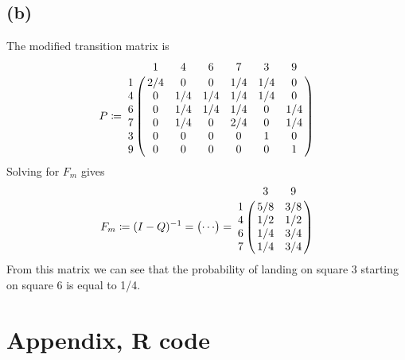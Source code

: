 \documentclass{article}
\begin{document}
\subsection{(b)}
The modified transition matrix is
\begin{equation}
	P \coloneqq \bordermatrix{~ & 1 & 4 & 6 & 7 & 3 & 9 \cr
		1 & 2/4 & 0 & 0 & 1/4 & 1/4 & 0 \cr
		4 & 0 & 1/4 & 1/4 & 1/4 & 1/4 & 0 \cr
		6 & 0 & 1/4 & 1/4 & 1/4 & 0 & 1/4 \cr
		7 & 0 & 1/4 & 0 & 2/4 & 0 & 1/4 \cr
		3 & 0 & 0 & 0 & 0 & 1 & 0 \cr
		9 & 0 & 0 & 0 & 0 & 0 & 1 \cr
		}
\end{equation}
Solving for $F_m$ gives
$$ F_m \coloneqq (I - Q)^{-1} = \begin{pmatrix}
		\cdots \\
	\end{pmatrix} =
	  \bordermatrix{~ & 3 & 9 \cr
		1 & 5/8 & 3/8 \cr
		4 & 1/2 & 1/2 \cr
		6 & 1/4 & 3/4 \cr
		7 & 1/4 & 3/4 \cr
		}
$$
From this matrix we can see that the probability of landing on square 3 starting on square 6 is equal to 1/4.

\appendix
\section{Appendix, R code}

\end{document}
